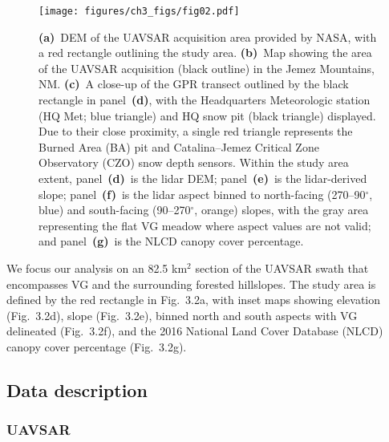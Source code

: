 \begin{figure}[t]
\centering\texttt{[image: figures/ch3\_figs/fig02.pdf]}
\caption{\textbf{(a)}~DEM of the UAVSAR acquisition area provided by NASA, with a red rectangle outlining the study area. \textbf{(b)}~Map showing the area of the UAVSAR acquisition (black outline) in the Jemez Mountains, NM. \textbf{(c)}~A close-up of the GPR transect outlined by the black rectangle in panel~\textbf{(d)}, with the Headquarters Meteorologic station (HQ Met; blue triangle) and HQ snow pit (black triangle) displayed. Due to their close proximity, a single red triangle represents the Burned Area (BA) pit and Catalina--Jemez Critical Zone Observatory (CZO) snow depth sensors. Within the study area extent, panel~\textbf{(d)}~is the lidar DEM; panel~\textbf{(e)}~is the lidar-derived slope; panel~\textbf{(f)}~is the lidar aspect binned to north-facing (270--90$^{\circ}$, blue) and south-facing (90--270$^{\circ}$, orange) slopes, with the gray area representing the flat VG meadow where aspect values are not valid; and panel~\textbf{(g)}~is the NLCD canopy cover percentage.}
\end{figure}
\clearpage

We focus our analysis on an 82.5 km$^{2}$ section of the UAVSAR swath that encompasses VG and the surrounding forested hillslopes. The study area is defined by the red rectangle in Fig.~3.2a, with inset maps showing elevation (Fig.~3.2d), slope (Fig.~3.2e), binned north and south aspects with VG delineated (Fig.~3.2f), and the 2016 National Land Cover Database (NLCD) canopy cover percentage (Fig.~3.2g).

\hypertarget{ch3-methods-4}{\subsection{Data description}\label{ch3-methods-4}}
\hypertarget{ch3-methods-5}{\subsubsection{UAVSAR}\label{ch3-methods-5}}


